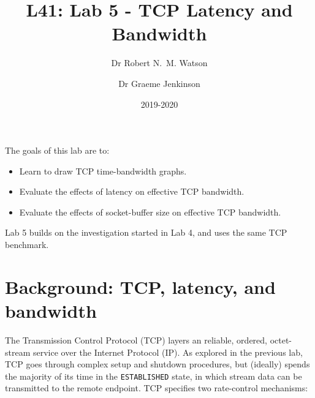 \documentclass[a4paper,10pt]{article}
\begin{document}
\title{L41: Lab 5 - TCP Latency and Bandwidth}
\author{Dr Robert N.~M. Watson \and Dr Graeme Jenkinson}
\date{2019-2020}
\maketitle

\noindent
The goals of this lab are to:
\begin{itemize}
\item Learn to draw TCP time-bandwidth graphs.
\item Evaluate the effects of latency on effective TCP bandwidth.
\item Evaluate the effects of socket-buffer size on effective TCP bandwidth.
\end{itemize}

\noindent
Lab 5 builds on the investigation started in Lab 4, and uses the same TCP
benchmark.

\section*{Background: TCP, latency, and bandwidth}

The Transmission Control Protocol (TCP) layers an reliable, ordered,
octet-stream service over the Internet Protocol (IP).
As explored in the previous lab, TCP goes through complex setup and shutdown
procedures, but (ideally) spends the majority of its time in the
\texttt{ESTABLISHED} state, in which stream data can be transmitted to the
remote endpoint.
TCP specifies two rate-control mechanisms:
\end{document}
